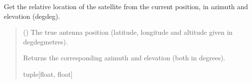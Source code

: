 \documentclass[letterpaper,10pt,english]{sphinxmanual}
\begin{document}
\begin{fulllineitems}
\begin{fulllineitems}
\begin{quote}
\begin{description}
\end{description}\end{quote}

\end{fulllineitems}


\begin{fulllineitems}
\label{\detokenize{modules/gps/satellite:qnav.gps.satellite.Satellite.get_location_azimuth_elevation}}
\pysigstartsignatures
{}
\pysigstopsignatures
\sphinxAtStartPar
Get the relative location of the satellite from the current position,
in azimuth and elevation (deg\sphinxhyphen{}deg).
\begin{quote}\begin{description}
\sphinxAtStartPar
{} (\sphinxstyleliteralemphasis{\sphinxupquote{ (}}\sphinxstyleliteralemphasis{\sphinxupquote{)}}) \textendash{} The true antenna position (latitude, longitude
and altitude given in deg\sphinxhyphen{}deg\sphinxhyphen{}metres).

\sphinxAtStartPar
Returns the corresponding azimuth and elevation (both in
degrees).

\sphinxAtStartPar
tuple{[}float, float{]}

\end{description}\end{quote}

\end{fulllineitems}



\end{fulllineitems}
\end{document}
